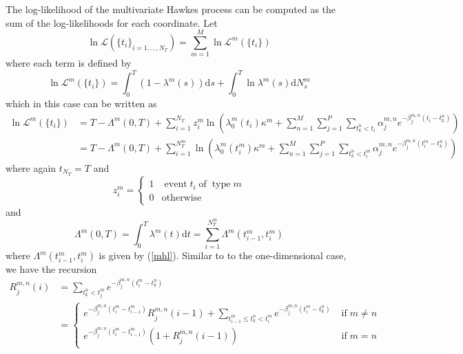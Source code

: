 \documentclass{amsart}
\newcommand{\mathd}{\mathrm{d}}
\newcommand{\tmop}[1]{\ensuremath{\operatorname{#1}}}
\begin{document}
The log-likelihood of the multivariate Hawkes process can be computed as the
sum of the log-likelihoods for each coordinate. Let
\begin{equation}
  \ln \mathcal{L} ( \{ t_i \}_{i = 1, \ldots, N^{}_T}) = \sum_{m = 1}^M \ln
  \mathcal{L}^m ( \{ t_i \})
\end{equation}
where each term is defined by
\begin{equation}
  \text{} \ln \mathcal{L}^m ( \{ t_i \}) = \int_0^T ( 1 - \lambda^m ( s))
  \mathd s + \int_0^T \ln \lambda^m ( s) \mathd N^m_s
\end{equation}
which in this case can be written as
\begin{equation}
  \begin{array}{ll}
    \text{} \ln \mathcal{L}^m ( \{ t_i \}) & = T - \Lambda^m ( 0, T) + \sum_{i
    = 1}^{N_T^{}} z_i^m \ln \left( \lambda_0^m ( t_i) \kappa^m + \sum_{n =
    1}^M \sum_{j = 1}^P \sum_{t_k^n < t_i} \alpha_j^{m, n} e^{- \beta_j^{m, n}
    ( t_i - t_k^n)} \right) \label{llmvh}\\
    & = T - \Lambda^m ( 0, T) + \sum_{i = 1}^{N_T^m} \ln \left( \lambda_0^m (
    t_i^m) \kappa^m + \sum_{n = 1}^M \sum_{j = 1}^P \sum_{t_k^n < t^m_i}
    \alpha_j^{m, n} e^{- \beta_j^{m, n} ( t_i^m - t_k^n)} \right)
  \end{array}
\end{equation}
where again $t_{N_T^{}} = T$ and
\begin{equation}
  z_i^m = \left\{ \begin{array}{ll}
    1 & \tmop{event} t_i \tmop{of} \tmop{type} m\\
    0 & \tmop{otherwise}
  \end{array} \right.
\end{equation}
and
\begin{equation}
  \Lambda^m ( 0, T) = \int_0^T \lambda_{}^m ( t) \mathd t = \sum_{i =
  1}^{N_T^m} \Lambda^m ( t_{i - 1}^m, t_i^m)
\end{equation}
where $\Lambda^m ( t_{i - 1}^m, t_i^m)$ is given by (\ref{mhl}). Similar to to
the one-dimensional case, we have the recursion
\begin{equation}
  \begin{array}{ll}
    R_j^{m, n} ( i) & = \sum_{t_k^n < t_j^m} e^{- \beta_j^{m, n} ( t_i^m -
    t_k^n)}\\
    & = \left\{ \begin{array}{ll}
      e^{- \beta_j^{m, n} ( t_i^m - t_{i - 1}^m)} R_j^{m, n} ( i - 1) +
      \sum_{t_{i - 1}^m \leqslant t_k^n < t_i^m} e^{- \beta_j^{m, n} ( t_i^m -
      t_k^n)} & \tmop{if} m \neq n\\
      e^{- \beta_j^{m, n} ( t_i^m - t_{i - 1}^m)}  ( 1 + R_j^{m, n} ( i - 1))
      & \tmop{if} m = n
    \end{array} \right.
  \end{array}
\end{equation}
\end{document}
